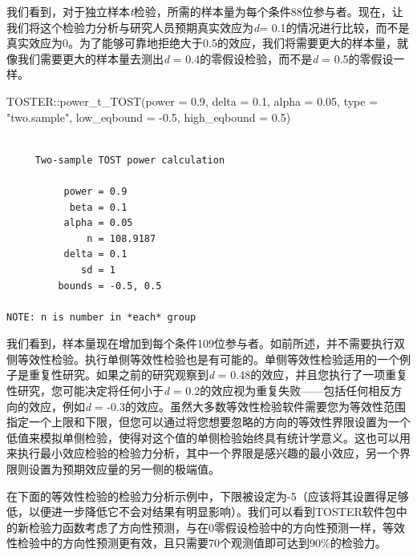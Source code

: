 \documentclass[
  letterpaper,
  DIV=11,
  numbers=noendperiod]{scrreprt}
\newenvironment{Shaded}{\begin{snugshade}}{\end{snugshade}}
\newcommand{\AttributeTok}[1]{\textcolor[rgb]{0.40,0.45,0.13}{#1}}
\newcommand{\FloatTok}[1]{\textcolor[rgb]{0.68,0.00,0.00}{#1}}
\newcommand{\FunctionTok}[1]{\textcolor[rgb]{0.28,0.35,0.67}{#1}}
\newcommand{\NormalTok}[1]{\textcolor[rgb]{0.00,0.23,0.31}{#1}}
\newcommand{\SpecialCharTok}[1]{\textcolor[rgb]{0.37,0.37,0.37}{#1}}
\newcommand{\StringTok}[1]{\textcolor[rgb]{0.13,0.47,0.30}{#1}}
\begin{document}
我们看到，对于独立样本\emph{t}检验，所需的样本量为每个条件88位参与者。现在，让我们将这个检验力分析与研究人员预期真实效应为\emph{d}=
0.1的情况进行比较，而不是真实效应为0。为了能够可靠地拒绝大于0.5的效应，我们将需要更大的样本量，就像我们需要更大的样本量去测出\emph{d}
= 0.4的零假设检验，而不是\emph{d} = 0.5的零假设一样。

\begin{Shaded}
\begin{Highlighting}[]
\NormalTok{TOSTER}\SpecialCharTok{::}\FunctionTok{power\_t\_TOST}\NormalTok{(}\AttributeTok{power =} \FloatTok{0.9}\NormalTok{, }\AttributeTok{delta =} \FloatTok{0.1}\NormalTok{,}
                     \AttributeTok{alpha =} \FloatTok{0.05}\NormalTok{, }\AttributeTok{type =} \StringTok{"two.sample"}\NormalTok{,}
                     \AttributeTok{low\_eqbound =} \SpecialCharTok{{-}}\FloatTok{0.5}\NormalTok{, }\AttributeTok{high\_eqbound =} \FloatTok{0.5}\NormalTok{)}
\end{Highlighting}
\end{Shaded}

\begin{verbatim}

     Two-sample TOST power calculation 

          power = 0.9
           beta = 0.1
          alpha = 0.05
              n = 108.9187
          delta = 0.1
             sd = 1
         bounds = -0.5, 0.5

NOTE: n is number in *each* group
\end{verbatim}

我们看到，样本量现在增加到每个条件109位参与者。如前所述，并不需要执行双侧等效性检验。执行单侧等效性检验也是有可能的。单侧等效性检验适用的一个例子是重复性研究。如果之前的研究观察到\emph{d}
= 0.48的效应，并且您执行了一项重复性研究，您可能决定将任何小于\emph{d} =
0.2的效应视为重复失败------包括任何相反方向的效应，例如\emph{d} =
-0.3的效应。虽然大多数等效性检验软件需要您为等效性范围指定一个上限和下限，但您可以通过将您想要忽略的方向的等效性界限设置为一个低值来模拟单侧检验，使得对这个值的单侧检验始终具有统计学意义。这也可以用来执行最小效应检验的检验力分析，其中一个界限是感兴趣的最小效应，另一个界限则设置为预期效应量的另一侧的极端值。

在下面的等效性检验的检验力分析示例中，下限被设定为-5（应该将其设置得足够低，以便进一步降低它不会对结果有明显影响）。我们可以看到TOSTER软件包中的新检验力函数考虑了方向性预测，与在0零假设检验中的方向性预测一样，等效性检验中的方向性预测更有效，且只需要70个观测值即可达到90\%的检验力。
\end{document}
